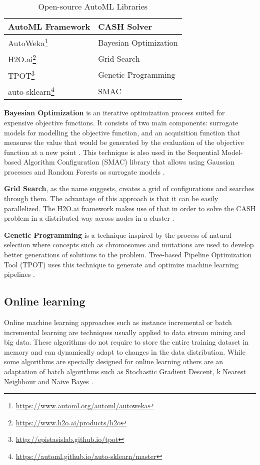 \documentclass{sig-alternate-br}
\begin{document}
\begin{savenotes}
\begin{table}[h]
\renewcommand{\arraystretch}{1.25}
\centering
\begin{tabular}{|l|l|}
\hline
\textbf{AutoML Framework} & \textbf{CASH Solver} \\ \hline
AutoWeka\footnote{\url{https://www.automl.org/automl/autoweka}} & Bayesian Optimization \\ \hline
H2O.ai\footnote{\url{https://www.h2o.ai/products/h2o}} & Grid Search \\ \hline
TPOT\footnote{\url{http://epistasislab.github.io/tpot}} & Genetic Programming \\ \hline
auto-sklearn\footnote{\url{https://automl.github.io/auto-sklearn/master}} &  SMAC \\ \hline
\end{tabular}
\caption{Open-source AutoML Libraries}
\label{table:libraries}
\end{table}
\end{savenotes}

\textbf{Bayesian Optimization} is an iterative optimization process suited for expensive objective functions. It consists of two main components: surrogate models for modelling the objective function, and an acquisition function that measures the value that would be generated by the evaluation of the objective function at a new point \cite{zoller2019survey}. This technique is also used in the Sequential Model-based Algorithm Configuration (SMAC) library that allows using Gaussian processes and Random Forests as surrogate models \cite{feurer2015autosklearn}.

\textbf{Grid Search}, as the name suggests, creates a grid of configurations and searches through them. The advantage of this approach is that it can be easily parallelized. The H2O.ai framework makes use of that in order to solve the CASH problem in a distributed way across nodes in a cluster \cite{h2o}. 

\textbf{Genetic Programming} is a technique inspired by the process of natural selection where concepts such as chromosomes and mutations are used to develop better generations of solutions to the problem. Tree-based Pipeline Optimization Tool (TPOT) uses this technique to generate and optimize machine learning pipelines \cite{tpot}.

\subsection{Online learning}
Online machine learning approaches such as instance incremental or batch incremental learning are techniques usually applied to data stream mining and big data. These algorithms do not require to store the entire training dataset in memory and can dynamically adapt to changes in the data distribution. While some algorithms are specially designed for online learning \cite{bifet2012ensembles} others are an adaptation of batch algorithms such as Stochastic Gradient Descent, k Nearest Neighbour and Naive Bayes \cite{van2014algorithm}.
\end{document}
